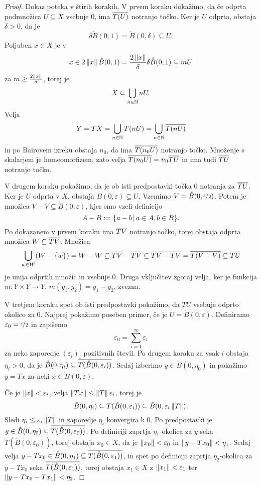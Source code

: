 \begin{proof}
  Dokaz poteka v štirih korakih.
  V prvem koraku dokažimo, da če odprta podmnožica $U \subseteq X$ vsebuje $0$,
  ima $\overline{T(U)}$ notranjo točko.
  Ker je $U$ odprta, obstaja $\delta > 0$, da je
  \[
	\delta \mathring{B}(0, 1) = \mathring{B}(0,\delta) \subseteq U.
  \]
  Poljuben $x \in X$ je v
  \[
	x \in 2 \left\lVert x\right\rVert \mathring{B}(0,1)
	= \frac{2 \left\lVert x\right\rVert}{\delta} \delta \mathring{B}(0,1) \subseteq m U
  \]
  za $m \ge \frac{2 \left\lVert x\right\rVert}{\delta}$, torej je
  \[
	X \subseteq \bigcup_{n \in \mathbb{N}} n U.
  \]
  Velja
  \[
	Y = TX = \bigcup_{n \in \mathbb{N}} T(n U)
	= \bigcup_{n \in \mathbb{N}} \overline{T(n U)}
  \]
  in po Bairovem izreku obstaja $n_0$, da ima $\overline{T(n_0 U)}$ notranjo točko.
  Množenje s skalarjem je homeomorfizem, zato velja $\overline{T(n_0 U)} = n_0
  \overline{TU}$ in ima tudi $\overline{TU}$ notranjo točko.

  V drugem koraku pokažimo, da je ob isti predpostavki točka $0$ notranja za
  $\overline{TU}$.
  Ker je $U$ odprta v $X$, obstaja $\mathring{B}(0,\varepsilon) \subseteq U$.
  Vzemimo $V = \mathring{B}(0, \nicefrac{\varepsilon}{2})$.
  Potem je množica $V - V \subseteq \mathring{B}(0, \varepsilon)$, kjer smo
  vzeli definicijo
  \[
	A - B := \{ a - b \,|\, a \in A, b \in B \}.
  \]
  Po dokazanem v prvem koraku ima $\overline{TV}$ notranjo točko, torej obstaja odprta
  množica $W \subseteq \overline{TV}$.
  Množica
  \[
	\bigcup_{w \in W} (W - \{w\}) = W - W
	\subseteq \overline{TV} - \overline{TV}
	\subseteq \overline{TV - TV}
	= \overline{T(V - V)}
	\subseteq \overline{TU}
  \]
  je unija odprtih množic in vsebuje $0$.
  Druga vključitev zgoraj velja, ker je funkcija $m: Y \times Y \to Y$, $m(y_1,
  y_2) = y_1 - y_2$, zvezna.

  V tretjem koraku spet ob isti predpostavki pokažimo, da $TU$ vsebuje odprto
  okolico za $0$.
  Najprej pokažimo poseben primer, če je $U = \mathring{B}(0, \varepsilon)$.
  Definiramo $\varepsilon_0 = \nicefrac{\varepsilon}{2}$ in zapišemo
  \[
	\varepsilon_0 = \sum_{i=1}^\infty \varepsilon_i
  \]
  za neko zaporedje $(\varepsilon_i)_i$ pozitivnih števil.
  Po drugem koraku za vsak $i$ obstaja $\eta_i > 0$, da je $\mathring{B}(0,
  \eta_i) \subseteq \overline{T(\mathring{B}(0, \varepsilon_i))}$.
  Sedaj izberimo $y \in \mathring{B}(0, \eta_0)$ in pokažimo $y = Tx$ za neki $x
  \in \mathring{B}(0, \varepsilon)$.

  Če je $\left\lVert x\right\rVert < \varepsilon_i$, velja $\left\lVert Tx\right\rVert \le \left\lVert T\right\rVert
  \varepsilon_i$, torej je
  \[
	\mathring{B}(0, \eta_i)
	\subseteq T(\mathring{B}(0, \varepsilon_i))
	\subseteq \mathring{B}(0, \varepsilon_i \left\lVert T\right\rVert).
  \]
  Sledi $\eta_i \le \varepsilon_i \left\lVert T\right\rVert$ in zaporedje $\eta_i$ konvergira k
  $0$.
  Po predpostavki je $y \in \mathring{B}(0,\eta_0) \subseteq
  \overline{T(\mathring{B}(0, \varepsilon_0))}$.
  Po definiciji zaprtja $\eta_1$-okolica za $y$ seka $T(\mathring{B}(0,
  \varepsilon_0))$, torej obstaja $x_0 \in X$, da je $\left\lVert x_0\right\rVert <
  \varepsilon_0$ in $\left\lVert y - Tx_0\right\rVert < \eta_1$.
  Sedaj velja $y - Tx_0 \in \mathring{B}(0, \eta_1) \subseteq
  \overline{T(\mathring{B}(0, \varepsilon_1))}$, in spet po definiciji zaprtja
  $\eta_2$-okolica za $y - Tx_0$ seka $\overline{T(\mathring{B}(0, \varepsilon_1))}$,
  torej obstaja $x_1 \in X$ z $\left\lVert x_1\right\rVert < \varepsilon_1$ ter $\left\lVert y - Tx_0 -
	Tx_1\right\rVert < \eta_2$.


\end{proof}
